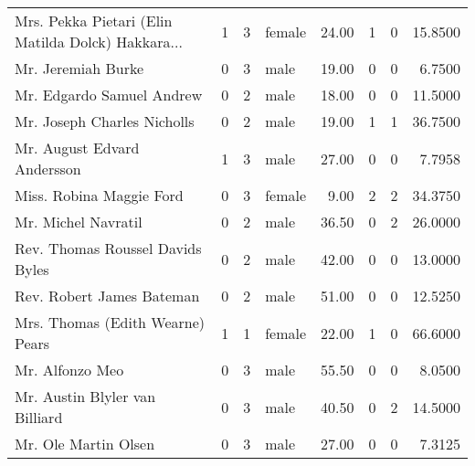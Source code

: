 \begin{tabular}{lrrlrrrr}
Mrs. Pekka Pietari (Elin Matilda Dolck) Hakkara... &         1 &       3 &  female &  24.00 &                        1 &                        0 &   15.8500 \\
Mr. Jeremiah Burke                                 &         0 &       3 &    male &  19.00 &                        0 &                        0 &    6.7500 \\
Mr. Edgardo Samuel Andrew                          &         0 &       2 &    male &  18.00 &                        0 &                        0 &   11.5000 \\
Mr. Joseph Charles Nicholls                        &         0 &       2 &    male &  19.00 &                        1 &                        1 &   36.7500 \\
Mr. August Edvard Andersson                        &         1 &       3 &    male &  27.00 &                        0 &                        0 &    7.7958 \\
Miss. Robina Maggie Ford                           &         0 &       3 &  female &   9.00 &                        2 &                        2 &   34.3750 \\
Mr. Michel Navratil                                &         0 &       2 &    male &  36.50 &                        0 &                        2 &   26.0000 \\
Rev. Thomas Roussel Davids Byles                   &         0 &       2 &    male &  42.00 &                        0 &                        0 &   13.0000 \\
Rev. Robert James Bateman                          &         0 &       2 &    male &  51.00 &                        0 &                        0 &   12.5250 \\
Mrs. Thomas (Edith Wearne) Pears                   &         1 &       1 &  female &  22.00 &                        1 &                        0 &   66.6000 \\
Mr. Alfonzo Meo                                    &         0 &       3 &    male &  55.50 &                        0 &                        0 &    8.0500 \\
Mr. Austin Blyler van Billiard                     &         0 &       3 &    male &  40.50 &                        0 &                        2 &   14.5000 \\
Mr. Ole Martin Olsen                               &         0 &       3 &    male &  27.00 &                        0 &                        0 &    7.3125 \\

\end{tabular}
